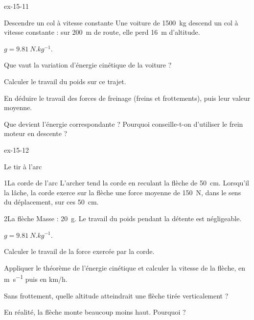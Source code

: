 \begin{blocLivre}{ex-15-11}
\begin{exercice}[2]{Descendre un col à vitesse constante}
Une voiture de \qty{1500}{kg} descend un col à vitesse constante : sur \qty{200}{m} de route, elle perd \qty{16}{m} d'altitude.
\begin{donnees}
$g=\qty{9,81}{N.kg^{-1}}$.
\end{donnees}
\begin{questions}
\item Que vaut la variation d'énergie cinétique de la voiture ?
\item Calculer le travail du poids sur ce trajet.
\item En déduire le travail des forces de freinage (freins et frottements), puis leur valeur moyenne.
\item Que devient l'énergie correspondante ? Pourquoi conseille-t-on d'utiliser le frein moteur en descente ?
\end{questions}
\end{exercice}
\end{blocLivre}
\begin{blocLivre}{ex-15-12}
\begin{exercice}[3]{Le tir à l'arc}
\begin{docu}{1}{La corde de l'arc}
L'archer tend la corde en reculant la flèche de \qty{50}{cm}. Lorsqu'il la lâche, la corde exerce sur la flèche une force moyenne de \qty{150}{N},
dans le sens du déplacement, sur ces \qty{50}{cm}.
\end{docu}
\begin{docu}{2}{La flèche}
Masse : \qty{20}{g}. Le travail du poids pendant la détente est négligeable.
\end{docu}
\begin{donnees}
$g=\qty{9,81}{N.kg^{-1}}$.
\end{donnees}
\begin{questions}
\item Calculer le travail de la force exercée par la corde.
\item Appliquer le théorème de l'énergie cinétique et calculer la vitesse de la flèche, en \unit{m.s^{-1}} puis en \unit{km/h}.
\item \initiative Sans frottement, quelle altitude atteindrait une flèche tirée verticalement ?
\item En réalité, la flèche monte beaucoup moins haut. Pourquoi ?
\end{questions}
\end{exercice}
\end{blocLivre}
